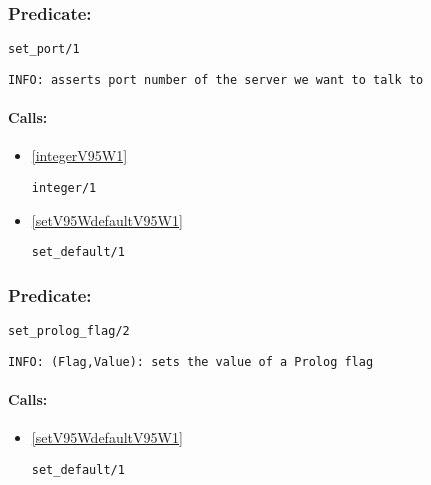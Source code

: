 \subsubsection{Predicate:} \label{setV95WportV95W1}

\begin{verbatim}
set_port/1
\end{verbatim}

{\small \begin{verbatim}
INFO: asserts port number of the server we want to talk to

\end{verbatim}}
\paragraph{Calls:} 
\begin{itemize}
\item \ref{integerV95W1} 
\begin{verbatim}
integer/1
\end{verbatim}

\item \ref{setV95WdefaultV95W1} 
\begin{verbatim}
set_default/1
\end{verbatim}

\end{itemize}

\subsubsection{Predicate:} \label{setV95WprologV95WflagV95W2}

\begin{verbatim}
set_prolog_flag/2
\end{verbatim}

{\small \begin{verbatim}
INFO: (Flag,Value): sets the value of a Prolog flag

\end{verbatim}}
\paragraph{Calls:} 
\begin{itemize}
\item \ref{setV95WdefaultV95W1} 
\begin{verbatim}
set_default/1
\end{verbatim}

\end{itemize}

